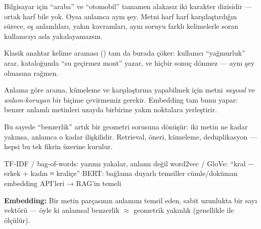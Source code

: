 

Bilgisayar için ``araba'' ve ``otomobil'' tamamen alakasız iki karakter
dizisidir --- ortak harf bile yok. Oysa anlamca aynı şey. Metni harf harf
karşılaştırdığın sürece, eş anlamlıları, yakın kavramları, aynı soruyu farklı
kelimelerle soran kullanıcıyı asla yakalayamazsın.


Klasik anahtar kelime araması () tam da burada çöker:
kullanıcı ``yağmurluk'' arar, kataloğunda ``su geçirmez mont'' yazar, ve hiçbir
sonuç dönmez --- aynı şey olmasına rağmen.

Anlama göre arama, kümeleme ve karşılaştırma yapabilmek için metni \emph{sayısal}
ve \emph{anlam-koruyan} bir biçime çevirmemiz gerekir. Embedding tam bunu yapar:
benzer anlamlı metinleri uzayda birbirine yakın noktalara yerleştirir.

Bu sayede ``benzerlik'' artık bir geometri sorusuna dönüşür: iki metin ne kadar
yakınsa, anlamca o kadar ilişkilidir. Retrieval, öneri, kümeleme, deduplikasyon ---
hepsi bu tek fikrin üzerine kurulur.

\begin{timeline}
 TF-IDF / bag-of-words: yazımı yakalar, anlamı değil \tlsep {} word2vec / GloVe: ``kral − erkek + kadın ≈ kraliçe'' \tlsep {} BERT: bağlama duyarlı temsiller \tlsep {} cümle/doküman embedding API'leri → RAG'in temeli
\end{timeline}

\begin{problembox}
\textbf{Embedding:} Bir metin parçasının anlamını temsil eden, sabit uzunlukta
bir sayı vektörü --- öyle ki anlamsal benzerlik $\approx$ geometrik yakınlık
(genellikle  ile ölçülür).
\end{problembox}

